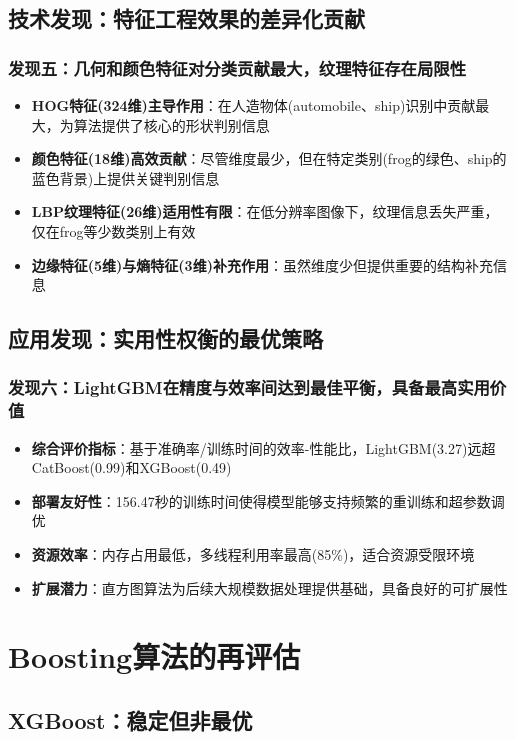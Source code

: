\documentclass[UTF8]{report}
\theoremstyle{MyLineTheoremStyle} %
\theoremstyle{MyBlockTheoremStyle} %
\theoremstyle{MySubsubsectionStyle} %
\begin{document}
\subsection{技术发现：特征工程效果的差异化贡献}
\subsubsection{发现五：几何和颜色特征对分类贡献最大，纹理特征存在局限性}
\begin{itemize}
    \item \textbf{HOG特征(324维)主导作用}：在人造物体(automobile、ship)识别中贡献最大，为算法提供了核心的形状判别信息
    \item \textbf{颜色特征(18维)高效贡献}：尽管维度最少，但在特定类别(frog的绿色、ship的蓝色背景)上提供关键判别信息
    \item \textbf{LBP纹理特征(26维)适用性有限}：在低分辨率图像下，纹理信息丢失严重，仅在frog等少数类别上有效
    \item \textbf{边缘特征(5维)与熵特征(3维)补充作用}：虽然维度少但提供重要的结构补充信息
\end{itemize}

\subsection{应用发现：实用性权衡的最优策略}
\subsubsection{发现六：LightGBM在精度与效率间达到最佳平衡，具备最高实用价值}
\begin{itemize}
    \item \textbf{综合评价指标}：基于准确率/训练时间的效率-性能比，LightGBM(3.27)远超CatBoost(0.99)和XGBoost(0.49)
    \item \textbf{部署友好性}：156.47秒的训练时间使得模型能够支持频繁的重训练和超参数调优
    \item \textbf{资源效率}：内存占用最低，多线程利用率最高(85\%)，适合资源受限环境
    \item \textbf{扩展潜力}：直方图算法为后续大规模数据处理提供基础，具备良好的可扩展性
\end{itemize}


\section{Boosting算法的再评估}
\subsection{XGBoost：稳定但非最优}
\end{document}
